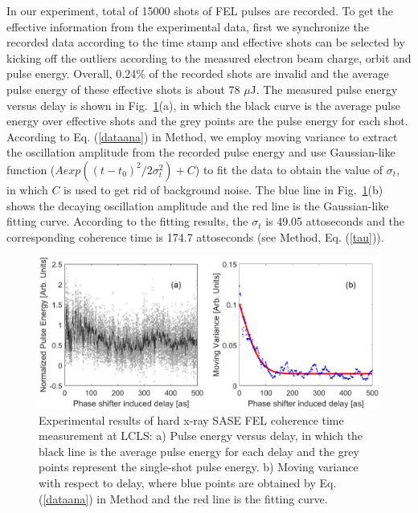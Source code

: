 \documentclass[%
 preprint,
 amsmath,amssymb,
 aps,
 prl,
 superscriptaddress,
 floatfix,
 letter,
]{revtex4-1}
\begin{document}
 In our experiment, total of 15000 shots of FEL pulses are recorded. To get the effective information from the experimental data, first we synchronize the recorded data according to the time stamp and effective shots can be selected by kicking off the outliers according to the measured electron beam charge, orbit and pulse energy. Overall, 0.24\% of the recorded shots are invalid and the average pulse energy of these effective shots is about 78 $\mu$J. The measured pulse energy versus delay is shown in Fig.~\ref{exp}(a), in which the black curve is the average pulse energy over effective shots and the grey points are the pulse energy for each shot. According to Eq. (\ref{dataana}) in Method, we employ moving variance to extract the oscillation amplitude from the recorded pulse energy and use Gaussian-like function ($Aexp((t-t_{0})^2/2\sigma_t^2)+C$) to fit the data to obtain the value of $\sigma_{t}$, in which $C$ is used to get rid of background noise. The blue line in Fig.~\ref{exp}(b) shows the decaying oscillation amplitude and the red line is the Gaussian-like fitting curve. According to the fitting results, the $\sigma_{t}$ is 49.05 attoseconds and the corresponding coherence time is 174.7 attoseconds (see Method, Eq. (\ref{tau})).
\begin{figure}[htp]
        \centering
        \includegraphics[width=17cm,angle=0]{exp.eps}
        \caption{\label{exp}
        Experimental results of hard x-ray SASE FEL coherence time measurement at LCLS: a) Pulse energy versus delay, in which the black line is the average pulse energy for each delay and the grey points represent the single-shot pulse energy. b) Moving variance with respect to delay, where blue points are obtained by Eq.(\ref{dataana}) in Method and the red line is the fitting curve.}
\end{figure}
\end{document}
